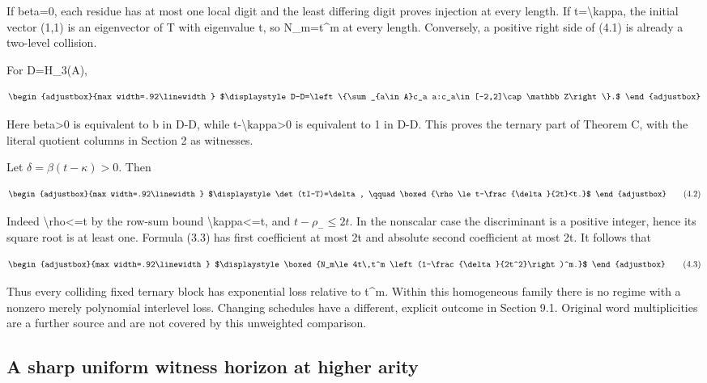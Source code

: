 If beta=0, each residue has at most one local digit and the least differing digit proves injection at every length. If t=\textbackslash kappa, the initial vector (1,1) is an eigenvector of T with eigenvalue t, so N\_m=t\^{}m at every length. Conversely, a positive right side of (4.1) is already a two-level collision.

For D=H\_3(A),

\[
\begin{adjustbox}{max width=.92\linewidth}
$\displaystyle D-D=\left\{\sum_{a\in A}c_a a:c_a\in[-2,2]\cap\mathbb Z\right\}.$
\end{adjustbox}
\]

Here beta\textgreater0 is equivalent to b in D-D, while t-\textbackslash kappa\textgreater0 is equivalent to 1 in D-D. This proves the ternary part of Theorem C, with the literal quotient columns in Section 2 as witnesses.

Let \(\delta=\beta(t-\kappa)>0\). Then

\[
\begin{adjustbox}{max width=.92\linewidth}
$\displaystyle \det(tI-T)=\delta,
\qquad
\boxed{\rho\le t-\frac{\delta}{2t}<t.}$
\end{adjustbox}
\tag{4.2}
\]

Indeed \textbackslash rho\textless=t by the row-sum bound \textbackslash kappa\textless=t, and \(t-\rho_-\le2t\). In the nonscalar case the discriminant is a positive integer, hence its square root is at least one. Formula (3.3) has first coefficient at most 2t and absolute second coefficient at most 2t. It follows that

\[
\begin{adjustbox}{max width=.92\linewidth}
$\displaystyle \boxed{N_m\le4t\,t^m
\left(1-\frac{\delta}{2t^2}\right)^m.}$
\end{adjustbox}
\tag{4.3}
\]

Thus every colliding fixed ternary block has exponential loss relative to t\^{}m. Within this homogeneous family there is no regime with a nonzero merely polynomial interlevel loss. Changing schedules have a different, explicit outcome in Section 9.1. Original word multiplicities are a further source and are not covered by this unweighted comparison.

\subsection{A sharp uniform witness horizon at higher arity}\label{n22-a-sharp-uniform-witness-horizon-at-higher-arity}

